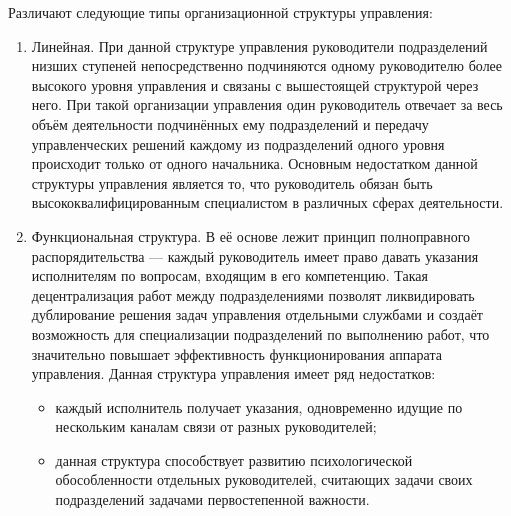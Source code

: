 \documentclass[12pt, russian, oneside, article]{ncc}
\begin{document}
Различают следующие типы организационной структуры управления:
\begin{enumerate}
\item Линейная. При данной структуре управления руководители подразделений низших ступеней непосредственно подчиняются одному руководителю более высокого уровня управления и связаны  с вышестоящей структурой через него. При такой организации управления один руководитель отвечает за весь объём деятельности подчинённых ему подразделений и передачу управленческих решений каждому из подразделений одного уровня происходит только от одного начальника. Основным недостатком данной структуры управления является то, что руководитель обязан быть высококвалифицированным специалистом в различных сферах деятельности.
\item Функциональная структура. В её основе лежит принцип полноправного распорядительства --- каждый руководитель имеет право давать указания исполнителям по вопросам, входящим в его компетенцию. Такая децентрализация работ между подразделениями позволят ликвидировать дублирование решения задач управления отдельными службами и создаёт возможность для специализации подразделений по выполнению работ, что значительно повышает эффективность функционирования аппарата управления. Данная структура управления имеет ряд недостатков:

\begin{itemize}
\item каждый исполнитель получает указания, одновременно идущие по нескольким каналам связи от разных руководителей;
\item данная структура способствует развитию психологической обособленности отдельных руководителей, считающих задачи своих подразделений задачами первостепенной важности.
\end{itemize}


\end{enumerate}
\end{document}
